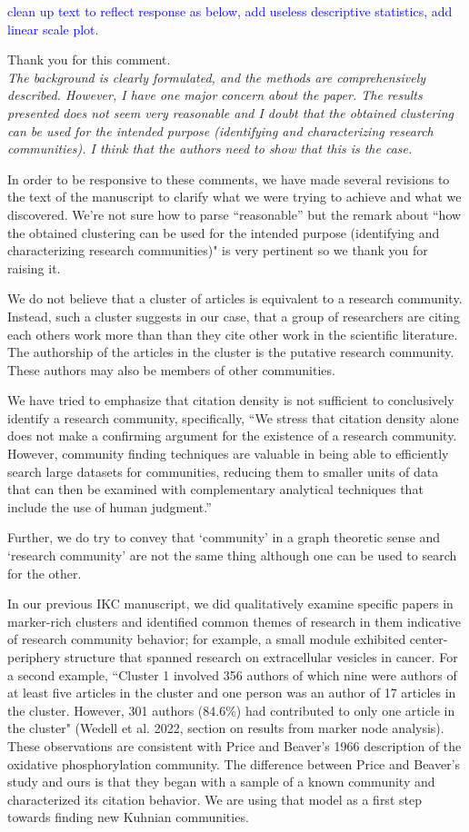 \documentclass[11pt, oneside]{article}   	%
\begin{document}
\textcolor{blue}{clean up text to reflect response as below, add useless descriptive statistics, add linear scale plot}.

Thank you for this comment.\\

\emph{The background is clearly formulated, and the methods are comprehensively described. However, I have one major concern about the paper. The results presented does not seem very reasonable and I doubt that the obtained clustering can be used for the intended purpose (identifying and characterizing research communities). I think that the authors need to show that this is the case.}

In order to be responsive to these comments, we have made several revisions to the text of the manuscript to clarify what we were trying to achieve and what we discovered. We're not 
sure how to parse ``reasonable'' but the remark about ``how the obtained clustering can be used for the intended purpose (identifying and characterizing research communities)" is very pertinent so we thank you for raising it. 

We do not believe that a cluster of articles is equivalent to a research community. Instead, such a cluster suggests in our case, that a group of researchers are citing each others work more than than they cite other work in the scientific literature. The authorship of the articles in the cluster is the putative research community. These authors may also be members of other communities. 

We have tried to emphasize that citation density is not sufficient to conclusively identify a research community, specifically, ``We stress that citation density alone does not make a confirming argument for the existence of a research community. However, community finding techniques are valuable in being able to efficiently search large datasets for communities, reducing them to smaller units of data that can then be examined with complementary analytical techniques that include the use of human judgment.''

Further, we do try to convey that `community' in a graph theoretic sense and `research community' are not the same thing although one can be used to search for the other. 

In our previous IKC manuscript, we did qualitatively examine specific papers in marker-rich clusters and identified common themes of research in them indicative of research community behavior; for example, a small module exhibited center-periphery structure that spanned research on extracellular vesicles in cancer. For a second example, ``Cluster 1 involved 356 authors of which nine were authors of at least five articles in the cluster and one person was an author of 17 articles in the cluster. However, 301 authors (84.6\%) had contributed to only one article in the cluster" (Wedell et al. 2022, section on results from marker node analysis). These observations are consistent with Price and Beaver's 1966 description of the oxidative phosphorylation community. The difference between Price and Beaver's study and ours is that they began with a sample of a known community and characterized its citation behavior. We are using that model as a first step towards finding new Kuhnian communities. 
\end{document}
